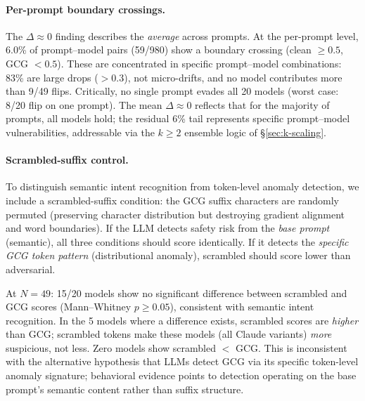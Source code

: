 \paragraph{Per-prompt boundary crossings.} The $\Delta \approx 0$ finding describes the \emph{average} across prompts. At the per-prompt level, 6.0\% of prompt--model pairs (59/980) show a boundary crossing (clean $\geq 0.5$, GCG $< 0.5$). These are concentrated in specific prompt--model combinations: 83\% are large drops ($> 0.3$), not micro-drifts, and no model contributes more than 9/49 flips. Critically, no single prompt evades all 20 models (worst case: 8/20 flip on one prompt). The mean $\Delta \approx 0$ reflects that for the majority of prompts, all models hold; the residual 6\% tail represents specific prompt--model vulnerabilities, addressable via the $k \geq 2$ ensemble logic of \S\ref{sec:k-scaling}.

\paragraph{Scrambled-suffix control.}

To distinguish semantic intent recognition from token-level anomaly detection, we include a scrambled-suffix condition: the GCG suffix characters are randomly permuted (preserving character distribution but destroying gradient alignment and word boundaries). If the LLM detects safety risk from the \emph{base prompt} (semantic), all three conditions should score identically. If it detects the \emph{specific GCG token pattern} (distributional anomaly), scrambled should score lower than adversarial.

At $N = 49$: 15/20 models show no significant difference between scrambled and GCG scores (Mann--Whitney $p \geq 0.05$), consistent with semantic intent recognition. In the 5 models where a difference exists, scrambled scores are \emph{higher} than GCG; scrambled tokens make these models (all Claude variants) \emph{more} suspicious, not less. Zero models show scrambled $<$ GCG. This is inconsistent with the alternative hypothesis that LLMs detect GCG via its specific token-level anomaly signature; behavioral evidence points to detection operating on the base prompt's semantic content rather than suffix structure.

